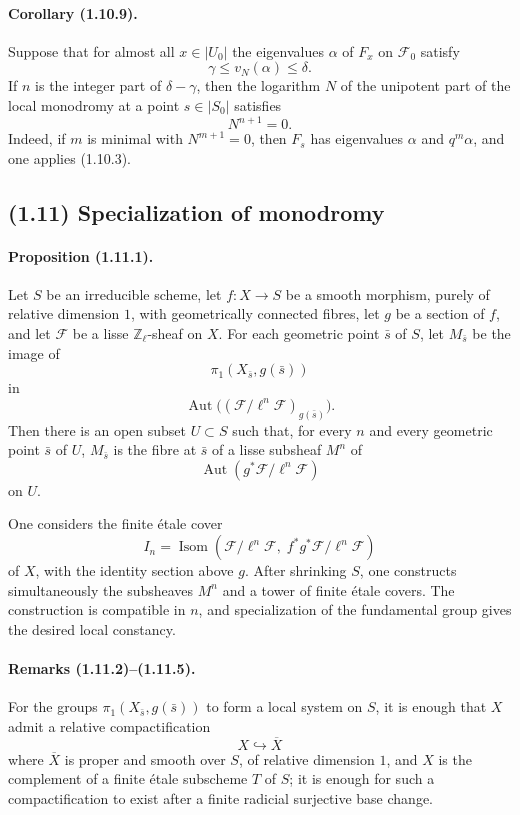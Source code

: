 \documentclass[11pt]{article}
\theoremstyle{remark}
\newcommand{\ZZ}{\mathbb{Z}}
\begin{document}
\paragraph{Corollary (1.10.9).}
Suppose that for almost all \(x\in |U_0|\) the eigenvalues \(\alpha\) of \(F_x\) on \(\mathcal F_0\) satisfy
\[
\gamma\le v_N(\alpha)\le \delta .
\]
If \(n\) is the integer part of \(\delta-\gamma\), then the logarithm \(N\) of the unipotent part of the local monodromy at a point \(s\in |S_0|\) satisfies
\[
N^{n+1}=0.
\]
Indeed, if \(m\) is minimal with \(N^{m+1}=0\), then \(F_s\) has eigenvalues \(\alpha\) and \(q^m\alpha\), and one applies (1.10.3).

\subsection*{(1.11) Specialization of monodromy}

\paragraph{Proposition (1.11.1).}
Let \(S\) be an irreducible scheme, let \(f:X\to S\) be a smooth morphism, purely of relative dimension \(1\), with geometrically connected fibres, let \(g\) be a section of \(f\), and let \(\mathcal F\) be a lisse \(\ZZ_\ell\)-sheaf on \(X\). For each geometric point \(\bar s\) of \(S\), let \(M_{\bar s}\) be the image of
\[
\pi_1(X_{\bar s},g(\bar s))
\]
in
\[
\operatorname{Aut}\bigl((\mathcal F/\ell^n\mathcal F)_{g(\bar s)}\bigr).
\]
Then there is an open subset \(U\subset S\) such that, for every \(n\) and every geometric point \(\bar s\) of \(U\), \(M_{\bar s}\) is the fibre at \(\bar s\) of a lisse subsheaf \(M^n\) of
\[
\operatorname{Aut}(g^*\mathcal F/\ell^n\mathcal F)
\]
on \(U\).

One considers the finite étale cover
\[
I_n=\operatorname{Isom}(\mathcal F/\ell^n\mathcal F,\; f^*g^*\mathcal F/\ell^n\mathcal F)
\]
of \(X\), with the identity section above \(g\). After shrinking \(S\), one constructs simultaneously the subsheaves \(M^n\) and a tower of finite étale covers. The construction is compatible in \(n\), and specialization of the fundamental group gives the desired local constancy.

\paragraph{Remarks (1.11.2)--(1.11.5).}
For the groups \(\pi_1(X_{\bar s},g(\bar s))\) to form a local system on \(S\), it is enough that \(X\) admit a relative compactification
\[
X\hookrightarrow \overline X
\]
where \(\overline X\) is proper and smooth over \(S\), of relative dimension \(1\), and \(X\) is the complement of a finite étale subscheme \(T\) of \(S\); it is enough for such a compactification to exist after a finite radicial surjective base change.
\end{document}
